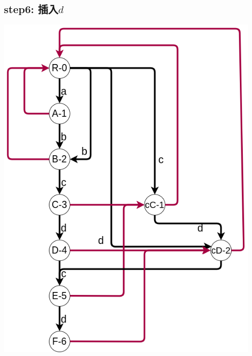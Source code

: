 \documentclass{article}
\begin{document}
\subsection{step6: 插入$d$}
\includegraphics[scale=0.35]{step6.png} \par
\end{document}
